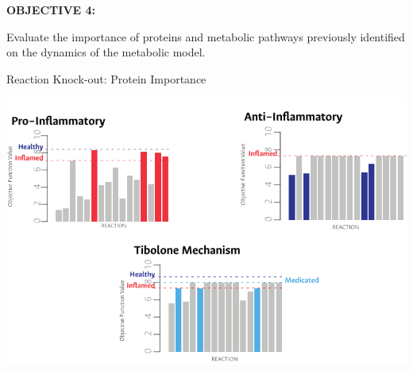 \documentclass[11pt]{beamer}
\begin{document}
\begin{frame}
\begin{block}{\textbf{OBJECTIVE 4:}}
\begin{center}
Evaluate the importance of proteins and metabolic pathways previously identified on the dynamics of the metabolic model.\end{center}\end{block}
\end{frame}
\begin{frame}{Reaction Knock-out: Protein Importance}
\begin{center}
\includegraphics[width=\textwidth]{Networks}
\end{center}
\end{frame}
\end{document}
